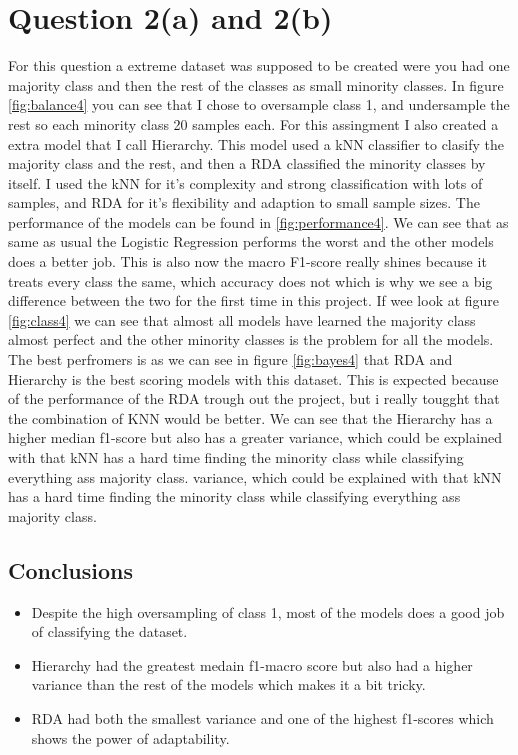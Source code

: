 \documentclass[11pt]{article}
\begin{document}
\section{Question 2(a) and 2(b)}
For this question a extreme dataset was supposed to be created were you had one majority class and then the rest of the classes as small minority classes. In figure \ref{fig:balance4} you can see that I chose to oversample class 1, and undersample the rest so each minority class 20 samples each. For this assingment I also created a extra model that I call Hierarchy. This model used a kNN classifier to clasify the majority class and the rest, and then a RDA classified the minority classes by itself. I used the kNN for it's complexity and strong classification with lots of samples, and RDA for it's flexibility and adaption to small sample sizes. The performance of the models can be found in \ref{fig:performance4}. We can see that as same as usual the Logistic Regression performs the worst and the other models does a better job. This is also now the macro F1-score really shines because it treats every class the same, which accuracy does not which is why we see a big difference between the two for the first time in this project. If wee look at figure \ref{fig:class4} we can see that almost all models have learned the majority class almost perfect and the other minority classes is the problem for all the models. The best perfromers is as we can see in figure \ref{fig:bayes4} that RDA and Hierarchy is the best scoring models with this dataset. This is expected because of the performance of the RDA trough out the project, but i really tougght that the combination of KNN would be better. We can see that the Hierarchy has a higher median f1-score but also has a greater variance, which could be explained with that kNN has a hard time finding the minority class while classifying everything ass majority class. variance, which could be explained with that kNN has a hard time finding the minority class while classifying everything ass majority class.
\newpage
\subsection{Conclusions}
\begin{itemize}
	\item Despite the high oversampling of class 1, most of the models does a good job of classifying the dataset.
	\item Hierarchy had the greatest medain f1-macro score but also had a higher variance than the rest of the models which makes it a bit tricky.
	\item RDA had both the smallest variance and one of the highest f1-scores which shows the power of adaptability.
\end{itemize}
\newpage
\end{document}
